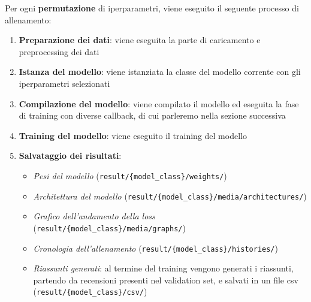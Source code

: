 Per ogni \textbf{permutazione} di iperparametri, viene eseguito il seguente processo di allenamento:
\begin{enumerate}
    \item \textbf{Preparazione dei dati}: viene eseguita la parte di caricamento e preprocessing dei dati
    \item \textbf{Istanza del modello}: viene istanziata la classe del modello corrente con gli iperparametri selezionati
    \item \textbf{Compilazione del modello}: viene compilato il modello ed eseguita la fase di training con diverse callback, di cui parleremo nella sezione successiva
    \item \textbf{Training del modello}: viene eseguito il training del modello 
    \item \textbf{Salvataggio dei risultati}:
          \begin{itemize}
              \item \textit{Pesi del modello} (\texttt{result/\{model\_class\}/weights/})
              \item \textit{Architettura del modello} (\texttt{result/\{model\_class\}/media/architectures/})
              \item \textit{Grafico dell'andamento della loss} (\texttt{result/\{model\_class\}/media/graphs/})
              \item \textit{Cronologia dell'allenamento} (\texttt{result/\{model\_class\}/histories/})
              \item \textit{Riassunti generati}: al termine del training vengono generati i riassunti, partendo da recensioni presenti nel validation set, e salvati in un file csv (\texttt{result/\{model\_class\}/csv/})
          \end{itemize}
\end{enumerate}

